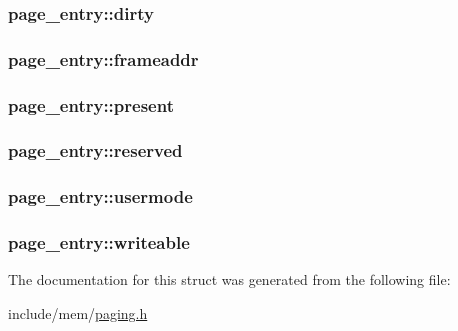 \subsubsection[{dirty}]{ page\+\_\+entry\+::dirty}\label{structpage__entry_ab3b5e22c6146f227a26bdec64e63f4b0}
\hypertarget{structpage__entry_a68a6dc54a7ab6f7fb1a068476190bf67}{}
\subsubsection[{frameaddr}]{ page\+\_\+entry\+::frameaddr}\label{structpage__entry_a68a6dc54a7ab6f7fb1a068476190bf67}
\hypertarget{structpage__entry_a34148a94af9bfabbb8c4f00f9865dfee}{}
\subsubsection[{present}]{ page\+\_\+entry\+::present}\label{structpage__entry_a34148a94af9bfabbb8c4f00f9865dfee}
\hypertarget{structpage__entry_af6d963f09b01571b107e6f505050c0e5}{}
\subsubsection[{reserved}]{ page\+\_\+entry\+::reserved}\label{structpage__entry_af6d963f09b01571b107e6f505050c0e5}
\hypertarget{structpage__entry_a2beafd3900a1f36f09af9c35a9a14f18}{}
\subsubsection[{usermode}]{ page\+\_\+entry\+::usermode}\label{structpage__entry_a2beafd3900a1f36f09af9c35a9a14f18}
\hypertarget{structpage__entry_a2ea8d7684fe45772b6acba70d46e41d9}{}
\subsubsection[{writeable}]{ page\+\_\+entry\+::writeable}\label{structpage__entry_a2ea8d7684fe45772b6acba70d46e41d9}


The documentation for this struct was generated from the following file\+:\begin{DoxyCompactItemize}
\item 
include/mem/\hyperlink{paging_8h}{paging.\+h}\end{DoxyCompactItemize}
